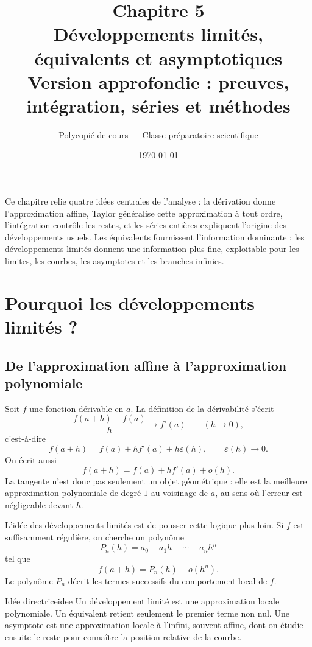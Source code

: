 \documentclass[11pt,a4paper]{article}
\title{\Huge\bfseries Chapitre 5\\[0.25em]
Développements limités, équivalents et asymptotiques\\[0.4em]
\Large Version approfondie : preuves, intégration, séries et méthodes}
\author{Polycopié de cours — Classe préparatoire scientifique}
\date{\today}
\newcommand{\eps}{\varepsilon}
\begin{document}
\maketitle
\thispagestyle{empty}

\begin{center}
\begin{tcolorbox}[width=0.95\textwidth,colframe=bleuprepa,colback=blue!3!white]
Ce chapitre relie quatre idées centrales de l'analyse : la dérivation donne l'approximation affine, Taylor généralise cette approximation à tout ordre, l'intégration contrôle les restes, et les séries entières expliquent l'origine des développements usuels. Les équivalents fournissent l'information dominante ; les développements limités donnent une information plus fine, exploitable pour les limites, les courbes, les asymptotes et les branches infinies.
\end{tcolorbox}
\end{center}

\tableofcontents
\newpage

\section{Pourquoi les développements limités ?}

\subsection{De l'approximation affine à l'approximation polynomiale}

Soit $f$ une fonction dérivable en $a$. La définition de la dérivabilité s'écrit
\[
  \frac{f(a+h)-f(a)}{h}\longrightarrow f'(a)\qquad(h\to0),
\]
c'est-à-dire
\[
  f(a+h)=f(a)+h f'(a)+h\eps(h),\qquad \eps(h)\to0.
\]
On écrit aussi
\[
  f(a+h)=f(a)+h f'(a)+o(h).
\]
La tangente n'est donc pas seulement un objet géométrique : elle est la meilleure approximation polynomiale de degré $1$ au voisinage de $a$, au sens où l'erreur est négligeable devant $h$.

L'idée des développements limités est de pousser cette logique plus loin. Si $f$ est suffisamment régulière, on cherche un polynôme
\[
  P_n(h)=a_0+a_1h+\cdots+a_nh^n
\]
tel que
\[
  f(a+h)=P_n(h)+o(h^n).
\]
Le polynôme $P_n$ décrit les termes successifs du comportement local de $f$.

\begin{retenirbox}{Idée directrice}{idee}
Un développement limité est une approximation locale polynomiale. Un équivalent retient seulement le premier terme non nul. Une asymptote est une approximation locale à l'infini, souvent affine, dont on étudie ensuite le reste pour connaître la position relative de la courbe.
\end{retenirbox}
\end{document}
